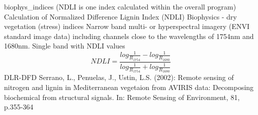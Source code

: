 %
{ %
biophys\_indices (NDLI is one index calculated within the overall program)
}
%
{ %
Calculation of Normalized Difference Lignin Index (NDLI)
}
%
{ %
Biophysics - dry vegetation (stress) indices
}
%
{ %
Narrow band multi- or hyperspectral imagery (ENVI standard image data) including channels close to the wavelengths of 1754nm and 1680nm.\bigskip
}
%
{ %
Single band with NDLI values
}
%
{ %
\begin{displaymath}
NDLI = \frac{log\frac{1}{R_{1754}}- log\frac{1}{R_{1680}} } {log\frac{1}{R_{1754}} + log\frac{1}{R_{1680}}}
\end{displaymath}
}
%
{ %
DLR-DFD
}
%
{ %
Serrano, L., Penuelas, J., Ustin, L.S. (2002): Remote sensing of nitrogen and lignin in Mediterranean vegetaion from AVIRIS data: Decomposing biochemical from structural signals. In: Remote Sensing of Environment, 81, p.355-364
}
